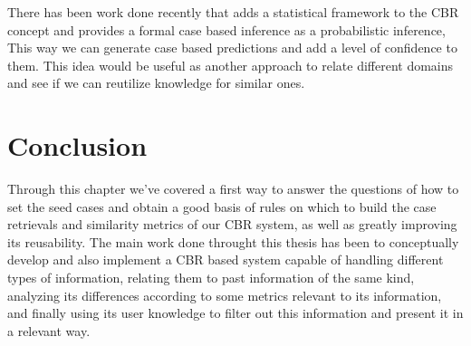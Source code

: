 There has been work done recently that adds a statistical framework to the CBR concept and provides a formal case based inference as a probabilistic inference, This way we can generate case based predictions and add a level of confidence to them. \cite{Hullermeier2007}
This idea would be useful as another approach to relate different domains and see if we can reutilize knowledge for similar ones.

\section{Conclusion}
Through this chapter we've covered a first way to answer the questions of how to set the seed cases and obtain a good basis of rules on which to build the case retrievals and similarity metrics of our CBR system, as well as greatly improving its reusability.
The main work done throught this thesis has been to conceptually develop and also implement a CBR based system capable of handling different types of information, relating them to past information of the same kind, analyzing its differences according to some metrics relevant to its information, and finally using its user knowledge to filter out this information and present it in a relevant way.
\medskip
